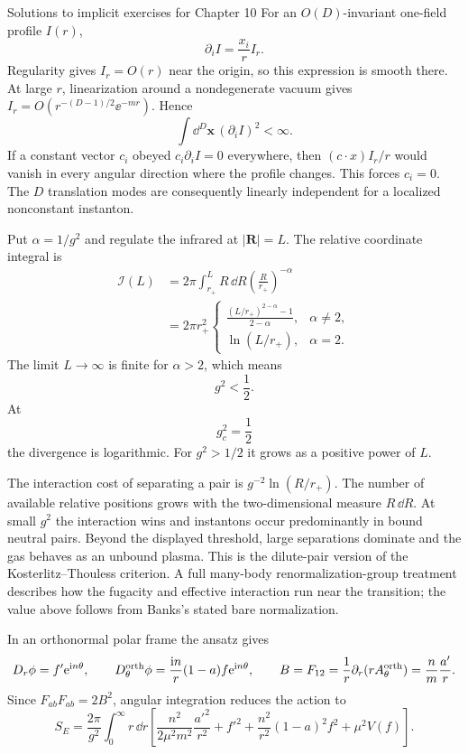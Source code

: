 \begin{bankssolutions}{Solutions to implicit exercises for Chapter 10}
For an $O(D)$-invariant one-field profile $I(r)$,
\[
  \partial_iI=\frac{x_i}{r}I_r.
\]
Regularity gives $I_r=O(r)$ near the origin, so this expression is smooth
there.  At large $r$, linearization around a nondegenerate vacuum gives
$I_r=O(r^{-(D-1)/2}\ee^{-mr})$.  Hence
\[
  \int\dd^D\mathbf x\,(\partial_iI)^2<\infty.
\]
If a constant vector $c_i$ obeyed $c_i\partial_iI=0$ everywhere, then
$(c\cdot x)I_r/r$ would vanish in every angular direction where the profile
changes.  This forces $c_i=0$.  The $D$ translation modes are consequently
linearly independent for a localized nonconstant instanton.

Put $\alpha=1/g^2$ and regulate the infrared at $|\mathbf R|=L$.  The relative
coordinate integral is
\[
\begin{aligned}
  \mathcal I(L)
  &=2\pi\int_{r_+}^{L}R\,\dd R
    \left(\frac{R}{r_+}\right)^{-\alpha}\\
  &=2\pi r_+^2
  \begin{cases}
    \displaystyle
    \frac{(L/r_+)^{2-\alpha}-1}{2-\alpha},&\alpha\ne2,\\[6pt]
    \displaystyle \ln(L/r_+),&\alpha=2.
  \end{cases}
\end{aligned}
\]
The limit $L\to\infty$ is finite for $\alpha>2$, which means
\[
  g^2<\frac12.
\]
At
\[
  g_c^2=\frac12
\]
the divergence is logarithmic.  For $g^2>1/2$ it grows as a positive power of
$L$.

The interaction cost of separating a pair is
$g^{-2}\ln(R/r_+)$.  The number of available relative positions grows with
the two-dimensional measure $R\,\dd R$.  At small $g^2$ the interaction wins
and instantons occur predominantly in bound neutral pairs.  Beyond the
displayed threshold, large separations dominate and the gas behaves as an
unbound plasma.  This is the dilute-pair version of the
Kosterlitz--Thouless criterion.  A full many-body renormalization-group
treatment describes how the fugacity and effective interaction run near the
transition; the value above follows from Banks's stated bare normalization.

In an orthonormal polar frame the ansatz gives
\[
  D_r\phi=f'\mathrm{e}^{\mathrm{i} n\theta},
  \qquad
  D_\theta^{\rm orth}\phi=\frac{\mathrm{i} n}{r}(1-a)f\mathrm{e}^{\mathrm{i} n\theta},
  \qquad
  B=F_{12}=\frac1r\partial_r(rA_\theta^{\rm orth})
  =\frac{n}{m}\frac{a'}r.
\]
Since $F_{ab}F_{ab}=2B^2$, angular integration reduces the action to
\[
  S_E=\frac{2\pi}{g^2}\int_0^\infty r\,\dd r
  \left[
    \frac{n^2}{2\mu^2m^2}\frac{a'^2}{r^2}
    +f'^2+\frac{n^2}{r^2}(1-a)^2f^2+\mu^2V(f)
  \right].
\]


\end{bankssolutions}
